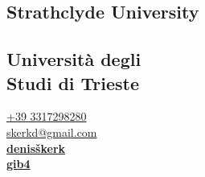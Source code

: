 \documentclass{dske-resume-openfont}
\begin{document}
%
%
\lastupdated{}

%
%

%
%

\begin{minipage}[t]{0.31\textwidth} 


{\fontsize{\the\leftColumnFont}{\the\leftColumnLineSpace}\selectfont
{\fontsize{\the\leftSubsectionSize}{\the\leftSubsectionLineSpace}\selectfont\subsection{Strathclyde University}}
{\fontsize{\the\leftColumnFont}{\the\leftColumnLineSpace}\selectfont
{}}
\vspace{\leftSmallGap}

{\fontsize{\the\leftSubsectionSize}{\the\leftSubsectionLineSpace}\selectfont\subsection{\texorpdfstring{Universit\`{a} degli\\ Studi di Trieste}{Universita degli Studi di Trieste}}}
{\fontsize{\the\leftColumnFont}{\the\leftColumnLineSpace}\selectfont
{}}
}


{\fontsize{\the\leftContactFontSize}{\the\leftContactLineSpace}\selectfont
\faPhone\hspace{\leftContactIconSpace} \href{tel:+393317298280}{+39 3317298280} \\[0.3em]
\faEnvelope\hspace{\leftContactIconSpace} \href{mailto:skerkd@gmail.com}{skerkd@gmail.com} \\[0.3em]
\faLinkedin\hspace{\leftContactIconSpace} \href{https://www.linkedin.com/in/denis-\%C5\%A1kerk/}{\bf denisškerk} \\[0.3em]
\faGithub\hspace{\leftContactIconSpace} \href{https://github.com/gib4}{\bf gib4}}


\end{minipage}
\end{document}
